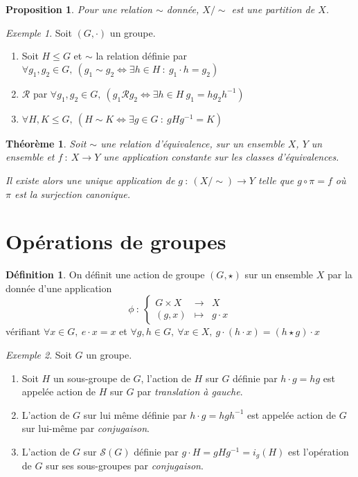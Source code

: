 \documentclass[]{article}
\newtheorem{mythm}{Théorème}
\newtheorem{myproposition}{Proposition}
\theoremstyle{remark}
\newtheorem{myexmpl}{Exemple}
\theoremstyle{definition}
\newtheorem{mydef}{Définition}
\newcommand{\func}[5]{
#1 ~ : ~ \left\{ \begin{array}{lcl}
	#2 & \longrightarrow & #3 \\
	#4 & \longmapsto & #5
\end{array}
\right.
}
\newcommand{\funcshort}[3]{
#1 ~ : ~ #2 \longrightarrow #3
}
\begin{document}
\begin{myproposition}
	Pour une relation $\sim$ donnée, $X/\sim$ est une partition de $X$.
\end{myproposition}

\begin{myexmpl}
	Soit $(G, \cdot)$ un groupe.
	
	\begin{enumerate}
		\item Soit $H \leqslant G$ et $\sim$ la relation définie par $\forall g_1, g_2 \in G, ~ (g_1 \sim g_2 \Longleftrightarrow \exists h \in H ~ : ~ g_1 \cdot h=g_2)$
		
		\item $\mathcal{R}$ par $\forall g_1, g_2 \in G, ~ (g_1 \mathcal{R} g_2 \Longleftrightarrow \exists h \in H ~ g_1 = h g_2 h^{-1})$
		
		\item $\forall H, K \leqslant G, ~ (H \sim K \Longleftrightarrow \exists g \in G ~ : ~ gHg^{-1}=K)$
	\end{enumerate}
\end{myexmpl}

\begin{mythm}
	Soit $\sim$ une relation d'équivalence, sur un ensemble $X$, $Y$ un ensemble et $\funcshort{f}{X}{Y}$ une application constante sur les classes d'équivalences.
	
	Il existe alors une unique application de $\funcshort{g}{(X/\sim)}{Y}$ telle que $g\circ \pi=f$ où $\pi$ est la surjection canonique.
\end{mythm}

\section{Opérations de groupes}

\begin{mydef}
	On définit une action de groupe $(G, \star)$ sur un ensemble $X$ par la donnée d'une application $$\func{\phi}{G \times X}{X}{(g,x)}{g \cdot x}$$
	vérifiant $\forall x \in G, ~ e \cdot x = x$ et $\forall g, h \in G, ~ \forall x \in X, ~ g \cdot (h \cdot x) = (h \star g) \cdot x$
\end{mydef}

\begin{myexmpl}
	Soit $G$ un groupe.
	\begin{enumerate}
		\item Soit $H$ un sous-groupe de $G$, l'action de $H$ sur $G$ définie par $h\cdot g = hg$ est appelée action de $H$ sur $G$ par \textit{translation à gauche}.
		
		\item L'action de $G$ sur lui même définie par $h\cdot g = hgh^{-1}$ est appelée action de $G$ sur lui-même par \textit{conjugaison}.
		
		\item L'action de $G$ sur $\mathcal{S}(G)$ définie par $g \cdot H=gHg^{-1}=i_g(H)$ est l'opération de $G$ sur ses sous-groupes par \textit{conjugaison}.
	\end{enumerate}
\end{myexmpl}
\end{document}
